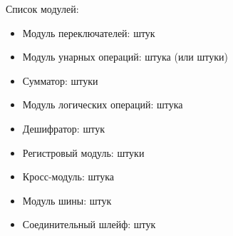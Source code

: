 Список модулей:
\begin{itemize}
    \item Модуль переключателей:  штук
    \item Модуль унарных операций:  штука (или  штуки)
    \item Сумматор:  штуки
    \item Модуль логических операций:  штука
    \item Дешифратор:  штук
    \item Регистровый модуль:  штуки
    \item Кросс-модуль:  штука
    \item Модуль шины:  штук
    \item Соединительный шлейф:  штук
\end{itemize}
